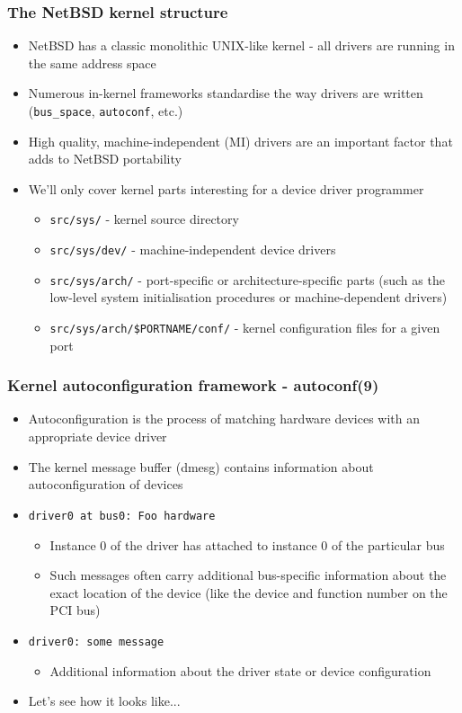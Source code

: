 \documentclass[dvipsnames,table]{beamer}
\begin{document}
\begin{frame}
\frametitle{The NetBSD kernel structure}
\begin{itemize}
	\item NetBSD has a classic monolithic UNIX-like kernel - all drivers are running in the same address space
	\item Numerous in-kernel frameworks standardise the way drivers are written ({\tt bus\_space}, {\tt autoconf}, etc.) 
	\item High quality, machine-independent (MI) drivers are an important factor that adds to NetBSD portability
	\item We'll only cover kernel parts interesting for a device driver programmer
	\begin{itemize}
	\item {\tt src/sys/} - kernel source directory
	\item {\tt src/sys/dev/} - machine-independent device drivers
	\item {\tt src/sys/arch/} - port-specific or architecture-specific parts (such as the low-level system initialisation procedures or machine-dependent drivers)
	\item {\tt src/sys/arch/\$PORTNAME/conf/} - kernel configuration files for a given port
	\end{itemize}

\end{itemize}
\end{frame}

\begin{frame}
\frametitle{Kernel autoconfiguration framework - autoconf(9)}
\begin{itemize}
	\item Autoconfiguration is the process of matching hardware devices with an
     appropriate device driver
    \item The kernel message buffer (dmesg) contains information about autoconfiguration of devices
    \item {\tt driver0 at bus0: Foo hardware} 
    \begin{itemize}
    	\item Instance 0 of the driver has attached to instance 0 of the particular bus
		\item Such messages often carry additional bus-specific information about the exact location of the device (like the device and function number on the PCI bus)
	\end{itemize}
    \item {\tt driver0: some message}
    \begin{itemize}
    	\item Additional information about the driver state or device configuration
	\end{itemize}
	\item Let's see how it looks like...
\end{itemize}
\end{frame}
\end{document}
